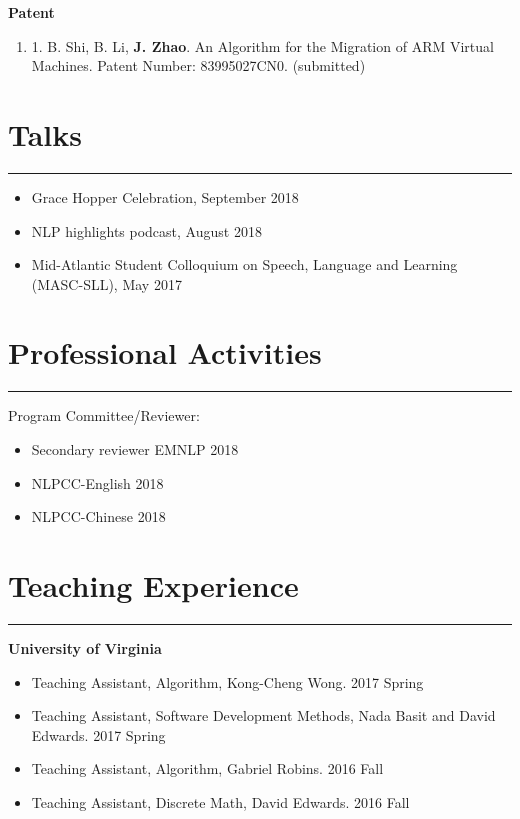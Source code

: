 \documentclass[11pt, a4paper]{article}
\newcommand{\hr}{\hrule\vspace{0.5em}}
\begin{document}
\vspace{0.5em}
\hspace{0.32in}\textbf{Patent}
\begin{enumerate}
	\item 1.	B. Shi, B. Li, \textbf{J. Zhao}. An Algorithm for the Migration of ARM Virtual Machines. Patent Number: 83995027CN0. (submitted)
\end{enumerate}

\section*{Talks}
\hr
\begin{itemize}
\item Grace Hopper Celebration, September 2018
\item NLP highlights podcast, August 2018
\item Mid-Atlantic Student Colloquium on Speech, Language and Learning (MASC-SLL), May 2017
\end{itemize}

\section*{Professional Activities}
\hr
Program Committee/Reviewer:
\begin{itemize}
\item Secondary reviewer EMNLP 2018
\item NLPCC-English 2018
\item NLPCC-Chinese 2018
\end{itemize}

\section*{Teaching Experience}
\hr
\textbf{University of Virginia}
\begin{itemize}
\item Teaching Assistant, Algorithm, Kong-Cheng Wong. 2017 Spring
\item Teaching Assistant, Software Development Methods, Nada Basit and David Edwards. 2017 Spring
\item Teaching Assistant, Algorithm, Gabriel Robins. 2016 Fall
\item Teaching Assistant, Discrete Math, David Edwards. 2016 Fall
\end{itemize}
\end{document}
